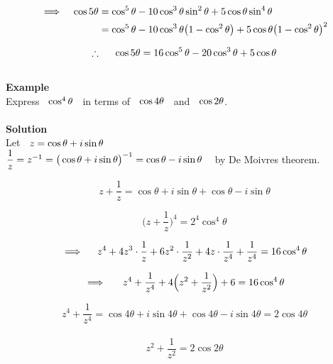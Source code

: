 \documentclass[11pt,a4paper]{article}
\begin{document}
\begin{align*}
\implies\hspace{0.3cm} \cos 5\theta & = \cos^5\theta - 10\cos^3\theta \sin^2\theta + 5\cos\theta \sin^4\theta\\
& = \cos^5\theta - 10\cos^3\theta \big(1 - \cos^2\theta\big) + 5\cos\theta \big(1 - \cos^2\theta\big)^2
\end{align*}


$$\therefore\hspace{0.5cm} \cos 5\theta  = 16\cos^5\theta - 20\cos^3\theta + 5\cos \theta$$\\






\textbf{Example}\\
Express $\hspace{0.2cm} \cos^4\theta\hspace{0.2cm}$ in terms of $\hspace{0.2cm} \cos 4\theta\hspace{0.2cm}$ and $\hspace{0.2cm} \cos 2\theta$.\\\\


\textbf{Solution}\\
Let $\hspace{0.2cm}  z = \cos \theta + i\sin \theta$\\

$\dfrac{1}{z} = z^{-1} = \big(\cos \theta + i\sin \theta\big)^{-1} = \cos \theta - i\sin \theta\hspace{0.3cm}$ by De Moivres theorem.

$$ z + \dfrac{1}{z} = \cos \theta + i\sin \theta + \cos\theta - i\sin \theta$$

$$\Bigg(z + \dfrac{1}{z}\Bigg)^4 = 2^4\cos^4\theta$$


$$\implies \hspace{0.4cm} z^4 + 4z^3\cdot \dfrac{1}{z}+ 6z^2\cdot\dfrac{1}{z^2} + 4z\cdot \dfrac{1}{z^4} + \dfrac{1}{z^4} = 16\cos^4\theta$$

$$\implies\hspace{0.5cm} z^4 + \dfrac{1}{z^4} + 4\Big( z^2 + \dfrac{1}{z^2}\Big) + 6  = 16\cos^4\theta$$

$$z^4 + \dfrac{1}{z^4} = \cos 4\theta + i \sin 4\theta  + \cos 4\theta - i\sin 4\theta = 2\cos 4\theta$$\\



$$z^2 + \dfrac{1}{z^2} = 2\cos 2\theta$$
\end{document}
